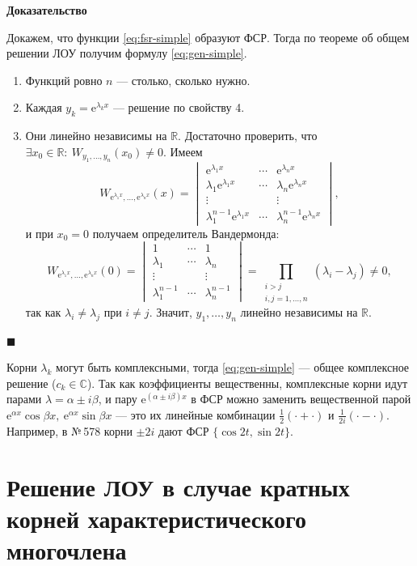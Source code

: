 \documentclass[12pt,a4paper]{article}
\numberwithin{equation}{section}
\newcommand{\R}{\mathbb{R}}
\newcommand{\e}{\mathrm{e}}
\renewenvironment{proof}[1][Доказательство]{\begin{center}\textbf{#1}\end{center}}{\hfill$\blacksquare$\par}
\begin{document}
\begin{proof}
Докажем, что функции \eqref{eq:fsr-simple} образуют ФСР. Тогда по теореме об общем решении ЛОУ получим формулу \eqref{eq:gen-simple}.
\begin{enumerate}[start=0]
\item Функций ровно \(n\) --- столько, сколько нужно.
\item Каждая \(y_k=\e^{\lambda_kx}\) --- решение по свойству 4.
\item Они линейно независимы на \(\R\). Достаточно проверить, что \(\exists x_0\in\R:\ W_{y_1,\ldots,y_n}(x_0)\neq0\). Имеем
\[
W_{\e^{\lambda_1x},\ldots,\e^{\lambda_nx}}(x)=
\begin{vmatrix}
\e^{\lambda_1x}&\cdots&\e^{\lambda_nx}\\
\lambda_1\e^{\lambda_1x}&\cdots&\lambda_n\e^{\lambda_nx}\\
\vdots&&\vdots\\
\lambda_1^{n-1}\e^{\lambda_1x}&\cdots&\lambda_n^{n-1}\e^{\lambda_nx}
\end{vmatrix},
\]
и при \(x_0=0\) получаем определитель Вандермонда:
\[
W_{\e^{\lambda_1x},\ldots,\e^{\lambda_nx}}(0)=
\begin{vmatrix}
1&\cdots&1\\
\lambda_1&\cdots&\lambda_n\\
\vdots&&\vdots\\
\lambda_1^{n-1}&\cdots&\lambda_n^{n-1}
\end{vmatrix}
=\prod_{\substack{i>j\\ i,j=1,\ldots,n}}(\lambda_i-\lambda_j)\neq0,
\]
так как \(\lambda_i\neq\lambda_j\) при \(i\neq j\). Значит, \(y_1,\ldots,y_n\) линейно независимы на \(\R\).
\end{enumerate}
\end{proof}

\begin{remarkHSE}
Корни \(\lambda_k\) могут быть комплексными, тогда \eqref{eq:gen-simple} --- общее комплексное решение (\(c_k\in\mathbb C\)). Так как коэффициенты вещественны, комплексные корни идут парами \(\lambda=\alpha\pm i\beta\), и пару \(\e^{(\alpha\pm i\beta)x}\) в ФСР можно заменить вещественной парой \(\e^{\alpha x}\cos\beta x,\ \e^{\alpha x}\sin\beta x\) --- это их линейные комбинации \(\frac12(\cdot+\cdot)\) и \(\frac1{2i}(\cdot-\cdot)\). Например, в №\,578 корни \(\pm2i\) дают ФСР \(\{\cos2t,\sin2t\}\).
\end{remarkHSE}

\section[Кратные корни]{Решение ЛОУ в случае кратных корней характеристического многочлена}
\label{sec:roots-multiple}
\end{document}
